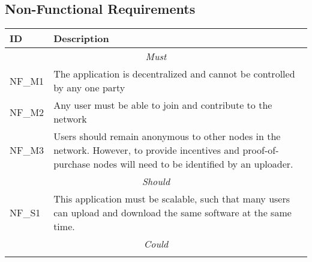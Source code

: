 \subsection{Non-Functional Requirements}

\begin{longtable}{ p{} p{} }
  \toprule
  \textbf{ID} & \textbf{Description}
  \\\midrule\midrule
  \multicolumn{2}{c}{\cellcolor{red!70}\textit{Must}}\\\midrule
  NF\_M1 & The application is decentralized and cannot be controlled by any one party\\
  NF\_M2 & Any user must be able to join and contribute to the network\\
  NF\_M3 & Users should remain anonymous to other nodes in the network. However, to provide incentives and proof-of-purchase nodes will need to be identified by an uploader. \\
  \midrule\multicolumn{2}{c}{\cellcolor{orange!70}\textit{Should}}\\\midrule
  NF\_S1 & This application must be scalable, such that many users can upload and download the same software at the same time.\\
  \midrule\multicolumn{2}{c}{\cellcolor{green}\textit{Could}}\\\midrule
  \\
  \midrule
  \bottomrule
\end{longtable}